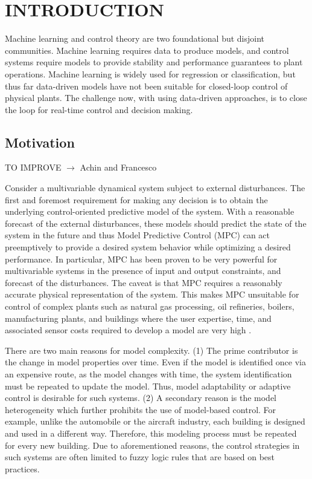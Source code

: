 \section{INTRODUCTION}
\label{S:intro}

Machine learning and control theory are two foundational but disjoint communities. Machine learning requires data to produce models, and control systems require models to provide stability and performance guarantees to plant operations. Machine learning is widely used for regression or classification, but thus far data-driven models have not been suitable for closed-loop control of physical plants. The challenge now, with using data-driven approaches, is to close the loop for real-time control and decision making.

\subsection{Motivation}
TO IMPROVE $\rightarrow$ \textcolor[rgb]{0,0,1}{Achin and Francesco}

Consider a multivariable dynamical system subject to external disturbances. The first and foremost requirement for making any decision is to obtain the underlying control-oriented predictive model of the system. With a reasonable forecast of the external disturbances, these models should predict the state of the system in the future and thus Model Predictive Control (MPC) can act preemptively to provide a desired system behavior while optimizing a desired performance. In particular, MPC has been proven to be very powerful for multivariable systems in the presence of input and output constraints, and forecast of the disturbances. The caveat is that MPC requires a reasonably accurate physical representation of the system. This makes MPC unsuitable for control of complex plants such as natural gas processing, oil refineries, boilers, manufacturing plants, and buildings where the user expertise, time, and associated sensor costs required to develop a model are very high \cite{Sturzenegger2016,vzavcekova2014}.

There are two main reasons for model complexity. 
(1) The prime contributor is the change in model properties over time. Even if the model is identified once via an expensive route, as the model changes with time, the system identification must be repeated to update the model. Thus, model adaptability or adaptive control is desirable for such systems. 
(2) A secondary reason is the model heterogeneity which further prohibits the use of model-based control. For example, unlike the automobile or the aircraft industry, each building is designed and used in a different way. Therefore, this modeling process must be repeated for every new building. 
Due to aforementioned reasons, the control strategies in such systems are often limited to fuzzy logic rules that are based on best practices. 


